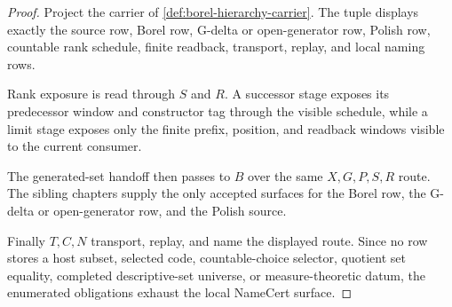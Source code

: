 \begin{proof}
Project the carrier of \autoref{def:borel-hierarchy-carrier}. The tuple displays exactly the source row, Borel row, G-delta or open-generator row, Polish row, countable rank schedule, finite readback, transport, replay, and local naming rows.

Rank exposure is read through $S$ and $R$. A successor stage exposes its predecessor window and constructor tag through the visible schedule, while a limit stage exposes only the finite prefix, position, and readback windows visible to the current consumer.

The generated-set handoff then passes to $B$ over the same $X,G,P,S,R$ route. The sibling chapters supply the only accepted surfaces for the Borel row, the G-delta or open-generator row, and the Polish source.

Finally $T,C,N$ transport, replay, and name the displayed route. Since no row stores a host subset, selected code, countable-choice selector, quotient set equality, completed descriptive-set universe, or measure-theoretic datum, the enumerated obligations exhaust the local NameCert surface.
\end{proof}

\begin{closurestatus}{\BorelHierarchyUp}
  \theoryclosure{\seedClosure}
  \formalstatus{\unformalizedV}
\end{closurestatus}
